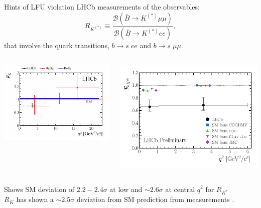 \documentclass[9pt,usenames,dvipsnames]{beamer}
\begin{document}
\begin{frame}{ Hints of LFU violation}
	LHCb measurements of the observables:
	\begin{equation*}
	R_{K^{(*)}} \equiv \frac{\mathcal B (\bar B \to K^{(*)} \mu \mu)}{\mathcal B (\bar B \to K^{(*)} ee)},
	\end{equation*}
	that involve the quark transitions, 
	$ b\to s \;ee$ and $ b\to s\; \mu \mu$. 
	\begin{columns}[c]
		\begin{center}
			\includegraphics[width= \textwidth]{./assets/RK}\\ {\tiny {}} 
		\end{center}
		\begin{center}
			\includegraphics[width= \textwidth]{./assets/RKstar} \\ {\tiny {}} 
		\end{center}
	\end{columns}
	Shows  SM deviation of $2.2-2.4 \sigma$ at low  and $ \sim 2.6 \sigma$ at central $q^2$ for $R_{K^{*}}$ \\
	$R_{K}$ has shown a $ \sim 2.5\sigma$ deviation from SM prediction from \LHCb measurements .
\end{frame}%
\end{document}

